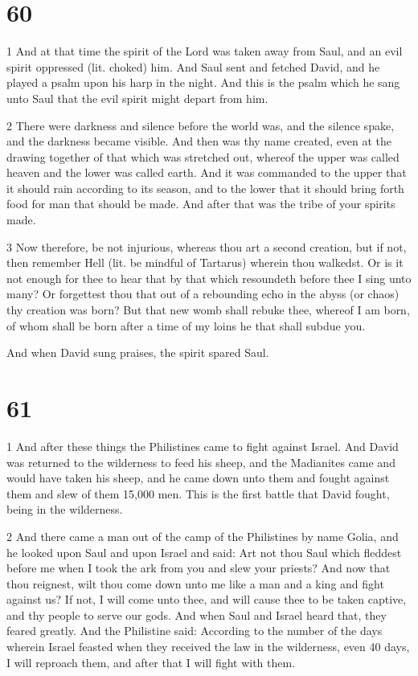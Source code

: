 \chapter{60}

\par 1 And at that time the spirit of the Lord was taken away from Saul, and an evil spirit oppressed (lit. choked) him. And Saul sent and fetched David, and he played a psalm upon his harp in the night. And this is the psalm which he sang unto Saul that the evil spirit might depart from him.

\par 2 There were darkness and silence before the world was, and the silence spake, and the darkness became visible. And then was thy name created, even at the drawing together of that which was stretched out, whereof the upper was called heaven and the lower was called earth. And it was commanded to the upper that it should rain according to its season, and to the lower that it should bring forth food for man that should be made. And after that was the tribe of your spirits made. 

\par 3 Now therefore, be not injurious, whereas thou art a second creation, but if not, then remember Hell (lit. be mindful of Tartarus) wherein thou walkedst. Or is it not enough for thee to hear that by that which resoundeth before thee I sing unto many? Or forgettest thou that out of a rebounding echo in the abyss (or chaos) thy creation was born? But that new womb shall rebuke thee, whereof I am born, of whom shall be born after a time of my loins he that shall subdue you.

\par And when David sung praises, the spirit spared Saul.

\chapter{61}

\par 1 And after these things the Philistines came to fight against Israel. And David was returned to the wilderness to feed his sheep, and the Madianites came and would have taken his sheep, and he came down unto them and fought against them and slew of them 15,000 men. This is the first battle that David fought, being in the wilderness.

\par 2 And there came a man out of the camp of the Philistines by name Golia, and he looked upon Saul and upon Israel and said: Art not thou Saul which fleddest before me when I took the ark from you and slew your priests? And now that thou reignest, wilt thou come down unto me like a man and a king and fight against us? If not, I will come unto thee, and will cause thee to be taken captive, and thy people to serve our gods. And when Saul and Israel heard that, they feared greatly. And the Philistine said: According to the number of the days wherein Israel feasted when they received the law in the wilderness, even 40 days, I will reproach them, and after that I will fight with them. 

